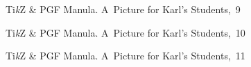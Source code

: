 \documentclass[a4paper,11pt]{article}
\begin{document}
\begin{figure}[ht]
  \centering

  \begin{tikzpicture}



  \end{tikzpicture}

  \caption{Ti\textit{k}Z \& PGF Manula. A~Picture for Karl's Students,~9}

\end{figure}





\begin{figure}[ht]

  \centering

  \begin{tikzpicture}



  \end{tikzpicture}

  \caption{Ti\textit{k}Z \& PGF Manula. A~Picture for Karl's Students,~10}

\end{figure}





\begin{figure}[ht]
  \centering

  \begin{tikzpicture}







  \end{tikzpicture}

  \caption{Ti\textit{k}Z \& PGF Manula. A~Picture for Karl's Students,~11}

\end{figure}
\end{document}
